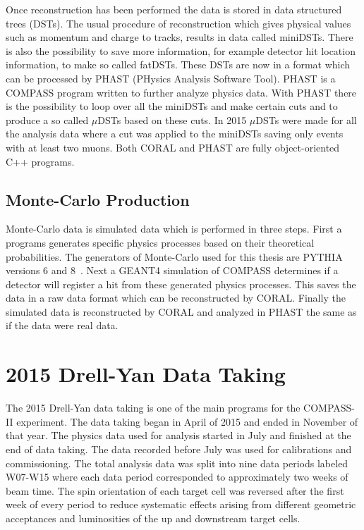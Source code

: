Once reconstruction has been performed the data is stored in data structured
trees (DSTs).  The usual procedure of reconstruction which gives physical values
such as momentum and charge to tracks, results in data called miniDSTs.  There
is also the possibility to save more information, for example detector hit
location information, to make so called fatDSTs.  These DSTs are now in a format
which can be processed by PHAST (PHysics Analysis Software Tool).  PHAST is a
COMPASS program written to further analyze physics data.  With PHAST there is
the possibility to loop over all the miniDSTs and make certain cuts and to
produce a so called $\mu$DSTs based on these cuts.  In 2015 $\mu$DSTs were made
for all the analysis data where a cut was applied to the miniDSTs saving only
events with at least two muons.  Both CORAL and PHAST are fully object-oriented
C++ programs. \par

\subsection{Monte-Carlo Production}
Monte-Carlo data is simulated data which is performed in three steps.  First a
programs generates specific physics processes based on their theoretical
probabilities.  The generators of Monte-Carlo used for this thesis are PYTHIA
versions 6 and 8~\cite{pythia}.  Next a GEANT4 simulation of COMPASS determines
if a detector will register a hit from these generated physics processes.  This
saves the data in a raw data format which can be reconstructed by CORAL.
Finally the simulated data is reconstructed by CORAL and analyzed in PHAST the
same as if the data were real data. \par


\section{2015 Drell-Yan Data Taking} \label{sec::compass_2015_dy_setup}
The 2015 Drell-Yan data taking is one of the main programs for the COMPASS-II
experiment.  The data taking began in April of 2015 and ended in November of
that year.  The physics data used for analysis started in July and finished at
the end of data taking.  The data recorded before July was used for calibrations
and commissioning.  The total analysis data was split into nine data periods
labeled W07-W15 where each data period corresponded to approximately two weeks
of beam time. The spin orientation of each target cell was reversed after the
first week of every period to reduce systematic effects arising from different
geometric acceptances and luminosities of the up and downstream target
cells. \par

